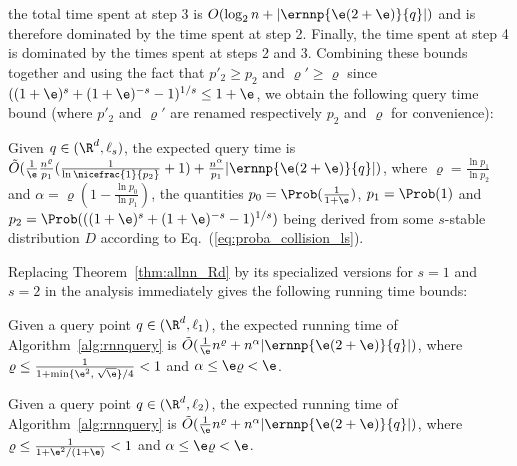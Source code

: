 the total time spent at step 3 is $O(\log_2 n +
|\ernnp{\e(2+\e)}{q}|)$ and is therefore dominated by the time spent
at step 2.  Finally, the time spent at step 4 is dominated by the
times spent at steps 2 and 3. Combining these bounds together and
using the fact that $p'_2\geq p_2$ and $\varrho'\geq\varrho$ since
$((1+\e)^s + (1+\e)^{-s}-1)^{1/s}\leq 1+\e$, we obtain the following
query time bound (where $p'_2$ and $\varrho'$ are renamed respectively
$p_2$ and $\varrho$ for convenience):
\begin{thm}\label{thm:rnnquerytime}
Given $q\in (\R^d, \ell_s)$, the expected query time is
$\tilde O (\frac{1}{\e}\frac{n^\varrho}{p_1}(\frac{1}{\ln
  \nicefrac{1}{p_2}}+1) + \frac{n^\alpha}{p_1}
|\ernnp{\e(2+\e)}{q}|)$, where $\varrho=\frac{\ln p_1}{\ln p_2}$ and
$\alpha=\varrho(1-\frac{\ln p_0}{\ln p_1})$, the quantities
$p_0=\Prob(\frac{1}{1+\e})$, $p_1=\Prob(1)$ and
$p_2=\Prob(((1+\e)^s+(1+\e)^{-s}-1)^{1/s})$ being derived from some
$s$-stable distribution $D$ according to
Eq.~(\ref{eq:proba_collision_ls}).
\end{thm}
Replacing Theorem~\ref{thm:allnn_Rd} by its specialized versions for
$s=1$ and $s=2$ in the analysis immediately gives the following
running time bounds:
\addtocounter{thm}{-1}
\begin{thm}[case $s=1$]\label{thm:rnnquerytime_l1}
Given a query point $q\in (\R^d, \ell_1)$, the expected running time
of Algorithm~\ref{alg:rnnquery} is $\tilde O (\frac{1}{\e} n^\varrho +
n^\alpha |\ernnp{\e(2+\e)}{q}|)$,
where $\varrho\leq \frac{1}{1+\min\{\e^2,\;\sqrt{\e}\}/4}<1$ and
$\alpha\leq \e\varrho<\e$.
\end{thm}
\addtocounter{thm}{-1}
\begin{thm}[case $s=2$]\label{thm:rnnquerytime_l2}
Given a query point $q\in (\R^d, \ell_2)$, the expected running time
of Algorithm~\ref{alg:rnnquery} is $\tilde O (\frac{1}{\e} n^\varrho +
n^\alpha |\ernnp{\e(2+\e)}{q}|)$,
where $\varrho\leq \frac{1}{1+\e^2/(1+\e)}<1$ and
$\alpha\leq \e\varrho<\e$.
\end{thm}


